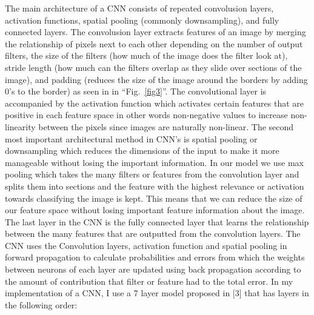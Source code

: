 \documentclass[Dealing with Imbalance in Computer Vision]{IEEEtran}
\begin{document}
The main architecture of a CNN consists of repeated convolusion layers, activation functions, spatial pooling (commonly downsampling), and fully connected layers. The convolusion layer extracts features of an image by merging the relationship of pixels next to each other depending on the number of output filters, the size of the filters (how much of the image does the filter look at), stride length (how much can the filters overlap as they slide over sections of the image), and padding (reduces the size of the image around the borders by adding 0's to the border) as seen in  in ``Fig.~\ref{fig3}''. The convolutional layer is accompanied by the activation function which activates certain features that are positive in each feature space in other words non-negative values to increase non-linearity between the pixels since images are naturally non-linear. The second most important architectural method in CNN's is spatial pooling or downsampling which reduces the dimensions of the input to make it more manageable without losing the important information. In our model we use max pooling which takes the many filters or features from the convolution layer and splits them into sections and the feature with the highest relevance or activation towards classifying the image is kept. This means that we can reduce the size of our feature space without losing important feature information about the image. The last layer in the CNN is the fully connected layer that learns the relationship between the many features that are outputted from the convolution layers. 
The CNN uses the Convolution layers, activation function and spatial pooling in forward propagation to calculate probabilities and errors 
from which the weights between neurons of each layer are updated using back propagation according to the amount of contribution that filter or feature had to the total error. 
In my implementation of a CNN, I use a 7 layer model proposed in [3] that has layers in the following order: 
\end{document}
